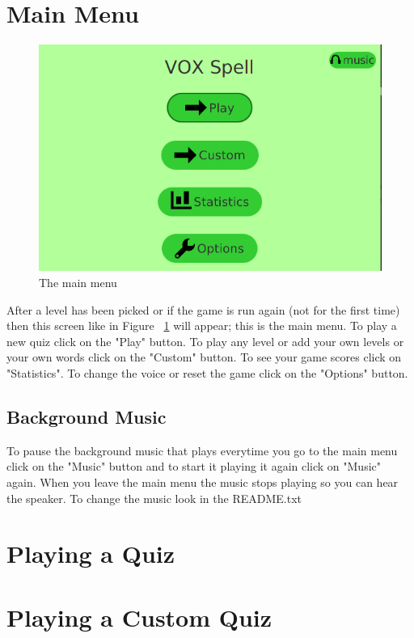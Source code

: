 \documentclass[12pt,a4paper,titlepage,onecolumn]{article}
\begin{document}
	\section{Main Menu}\label{mainmenu}
	\begin{figure}[h]
	\centering
	\includegraphics[width=1\linewidth]{"Figures/Main Menu/MainMenuGeneral"}
	\caption[Main Menu]{The main menu}
	\label{fig:MainMenuGeneral}
	\end{figure}
	After a level has been picked or if the game is run again (not for the first time) then this screen like in Figure ~\ref{fig:MainMenuGeneral} will appear; this is the main menu. To play a new quiz click on the "Play" button. To play any level or add your own levels or your own words click on the "Custom" button. To see your game scores click on "Statistics". To change the voice or reset the game click on the "Options" button. 
	\subsection{Background Music}
	To pause the background music that plays everytime you go to the main menu click on the "Music" button and to start it playing it again click on "Music" again. When you leave the main menu the music stops playing so you can hear the speaker. To change the music look in the README.txt
	
	\section{Playing a Quiz}

	\section{Playing a Custom Quiz}
		
\end{document}
